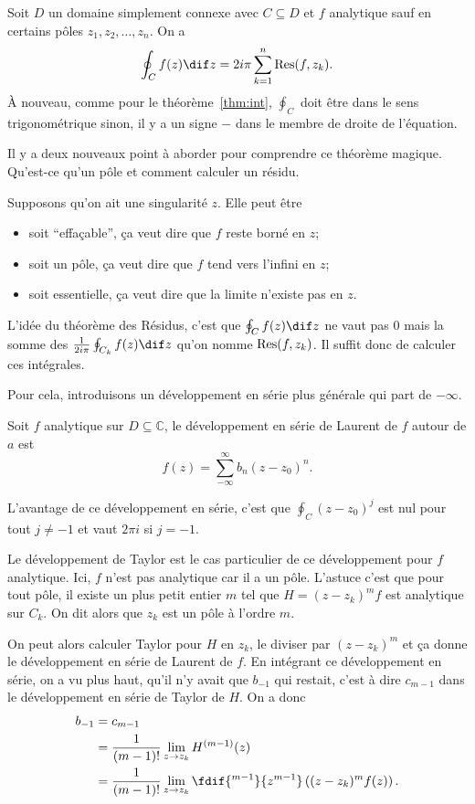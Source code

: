 \begin{mytheo}
  Soit $D$ un domaine simplement connexe avec
  $C \subseteq D$ et $f$ analytique
  sauf en certains pôles $z_1, z_2, \ldots, z_n$.
  On a
  \[ \oint_C f(z) \dif z = 2i\pi\sum_{k=1}^n \res(f, z_k). \]
  À nouveau,
  comme pour le théorème~\ref{thm:int},
  $\oint_C$ doit être dans le sens trigonométrique sinon,
  il y a un signe $-$ dans le membre de droite de l'équation.
\end{mytheo}

Il y a deux nouveaux point à aborder pour comprendre ce théorème
magique.
Qu'est-ce qu'un pôle et comment calculer un résidu.

Supposons qu'on ait une singularité $z$.
Elle peut être
\begin{itemize}
  \item soit ``effaçable'', ça veut dire que $f$ reste borné en $z$;
  \item soit un pôle, ça veut dire que $f$ tend vers l'infini en $z$;
  \item soit essentielle, ça veut dire que la limite n'existe pas en $z$.
\end{itemize}

L'idée du théorème des Résidus, c'est que $\oint_C f(z) \dif z$ ne vaut
pas 0 mais la somme des $\frac{1}{2i\pi} \oint_{C_k} f(z) \dif z$ qu'on
nomme $\operatorname{Res}(f, z_k)$.
Il suffit donc de calculer ces intégrales.

Pour cela, introduisons un développement en série plus générale qui
part de $-\infty$.
\begin{mydef}
  Soit $f$ analytique sur $D \subseteq \mathbb{C}$,
  le développement en série de Laurent de $f$ autour de $a$ est
  \[ f(z) = \sum_{-\infty}^{\infty}b_n(z-z_0)^n. \]
\end{mydef}
L'avantage de ce développement en série, c'est que
$\oint_C (z-z_0)^j$ est nul pour tout $j \neq -1$ et vaut $2\pi i$ si
$j = -1$.

Le développement de Taylor est le cas particulier de ce développement
pour $f$ analytique.
Ici, $f$ n'est pas analytique car il a un pôle.
L'astuce c'est que pour tout pôle, il existe un plus petit entier
$m$ tel que $H = (z-z_k)^mf$ est analytique sur $C_k$.
On dit alors que $z_k$ est un pôle à l'ordre $m$.

On peut alors calculer Taylor pour $H$ en $z_k$,
le diviser par $(z-z_k)^m$ et ça donne le développement en série de Laurent
de $f$.
En intégrant ce développement en série, on a vu plus haut,
qu'il n'y avait que $b_{-1}$ qui restait,
c'est à dire $c_{m-1}$ dans le développement en série de Taylor de
$H$.
On a donc
\begin{align*}
  b_{-1} & = c_{m-1}\\
  & = \frac{1}{(m-1)!}\lim_{z\to z_k} H^{(m-1)}(z)\\
  & = \frac{1}{(m-1)!}\lim_{z\to z_k} \fdif{^{m-1}}{z^{m-1}}
  \left((z-z_k)^m f(z)\right).
\end{align*}


